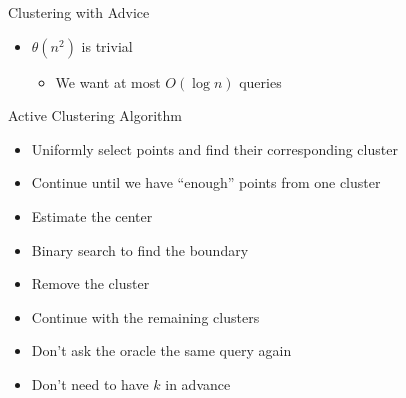 \documentclass{beamer}
\begin{document}
\begin{frame}{Clustering with Advice}
  \begin{itemize}
    
    \item $\theta(n^2)$ is trivial 
    
    \begin{itemize}
        \item We want at most $O(\log n)$ queries
    \end{itemize}

  \end{itemize}
\end{frame}

\begin{frame}{Active Clustering Algorithm}

    \begin{block}
    


    \begin{itemize}
    

    \item Uniformly select points and find their corresponding cluster
    \item Continue until we have ``enough'' points from one cluster
    \item Estimate the center
    \item Binary search to find the boundary
    \item Remove the cluster
    \item Continue with the remaining clusters
      \end{itemize}
  
  \end{block}
  \pause
  \begin{itemize}
      \item Don't ask the oracle the same query again
      \item Don't need to have $k$ in advance
  \end{itemize}

\end{frame}
\end{document}
